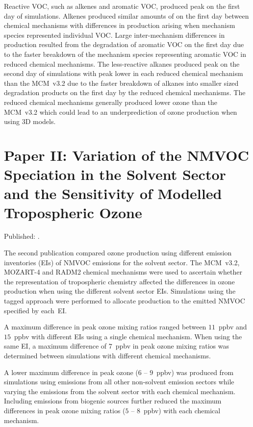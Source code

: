 Reactive VOC, such as alkenes and aromatic VOC, produced peak  on the first day of simulations.
Alkenes produced similar amounts of  on the first day between chemical mechanisms with differences in  production arising when mechanism species represented individual VOC.
Large inter-mechanism differences in  production resulted from the degradation of aromatic VOC on the first day due to the faster breakdown of the mechanism species representing aromatic VOC in reduced chemical mechanisms.
The less-reactive alkanes produced peak  on the second day of simulations with peak  lower in each reduced chemical mechanism than the MCM~v3.2 due to the faster breakdown of alkanes into smaller sized degradation products on the first day by the reduced chemical mechanisms.
The reduced chemical mechanisms generally produced lower ozone than the MCM~v3.2 which could lead to an underprediction of ozone production when using 3D models.

\newpage
\singlespacing
\section{Paper II: Variation of the NMVOC Speciation in the Solvent Sector and the Sensitivity of Modelled Tropospheric Ozone} \label{s:EI_results}
\onehalfspacing

\vspace{-6mm}
\noindent
Published: .
\vspace{5mm}

The second publication compared ozone production using different emission inventories (EIs) of NMVOC emissions for the solvent sector.
The MCM~v3.2, MOZART-4 and RADM2 chemical mechanisms were used to ascertain whether the representation of tropospheric chemistry affected the differences in ozone production when using the different solvent sector EIs.
Simulations using the tagged approach were performed to allocate  production to the emitted NMVOC specified by each~EI.

A maximum difference in peak ozone mixing ratios ranged between $11$~ppbv and $15$~ppbv with different EIs using a single chemical mechanism.
When using the same EI, a maximum difference of $7$~ppbv in peak ozone mixing ratios was determined between simulations with different chemical mechanisms.

A lower maximum difference in peak ozone ($6$ -- $9$~ppbv) was produced from simulations using emissions from all other non-solvent emission sectors while varying the emissions from the solvent sector with each chemical mechanism.
Including emissions from biogenic sources further reduced the maximum differences in peak ozone mixing ratios ($5$ -- $8$~ppbv) with each chemical mechanism.


